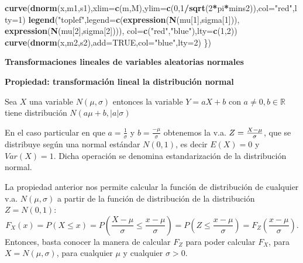 \documentclass[]{book}
\newenvironment{Shaded}{\begin{snugshade}}{\end{snugshade}}
\newcommand{\DataTypeTok}[1]{\textcolor[rgb]{0.13,0.29,0.53}{#1}}
\newcommand{\DecValTok}[1]{\textcolor[rgb]{0.00,0.00,0.81}{#1}}
\newcommand{\KeywordTok}[1]{\textcolor[rgb]{0.13,0.29,0.53}{\textbf{#1}}}
\newcommand{\NormalTok}[1]{#1}
\newcommand{\OperatorTok}[1]{\textcolor[rgb]{0.81,0.36,0.00}{\textbf{#1}}}
\newcommand{\OtherTok}[1]{\textcolor[rgb]{0.56,0.35,0.01}{#1}}
\newcommand{\StringTok}[1]{\textcolor[rgb]{0.31,0.60,0.02}{#1}}
\begin{document}
\begin{Shaded}
\begin{Highlighting}[]
\KeywordTok{curve}\NormalTok{(}\KeywordTok{dnorm}\NormalTok{(x,m1,s1),}\DataTypeTok{xlim=}\KeywordTok{c}\NormalTok{(m,M),}\DataTypeTok{ylim=}\KeywordTok{c}\NormalTok{(}\DecValTok{0}\NormalTok{,}\DecValTok{1}\OperatorTok{/}\KeywordTok{sqrt}\NormalTok{(}\DecValTok{2}\OperatorTok{*}\NormalTok{pi}\OperatorTok{*}\NormalTok{mins2)),}\DataTypeTok{col=}\StringTok{"red"}\NormalTok{,}\DataTypeTok{lty=}\DecValTok{1}\NormalTok{)}
\KeywordTok{legend}\NormalTok{(}\StringTok{"toplef"}\NormalTok{,}\DataTypeTok{legend=}\KeywordTok{c}\NormalTok{(}\KeywordTok{expression}\NormalTok{(}\KeywordTok{N}\NormalTok{(mu[}\DecValTok{1}\NormalTok{],sigma[}\DecValTok{1}\NormalTok{])),}
                         \KeywordTok{expression}\NormalTok{(}\KeywordTok{N}\NormalTok{(mu[}\DecValTok{2}\NormalTok{],sigma[}\DecValTok{2}\NormalTok{]))),}
       \DataTypeTok{col=}\KeywordTok{c}\NormalTok{(}\StringTok{"red"}\NormalTok{,}\StringTok{"blue"}\NormalTok{),}\DataTypeTok{lty=}\KeywordTok{c}\NormalTok{(}\DecValTok{1}\NormalTok{,}\DecValTok{2}\NormalTok{))}
\KeywordTok{curve}\NormalTok{(}\KeywordTok{dnorm}\NormalTok{(x,m2,s2),}\DataTypeTok{add=}\OtherTok{TRUE}\NormalTok{,}\DataTypeTok{col=}\StringTok{"blue"}\NormalTok{,}\DataTypeTok{lty=}\DecValTok{2}\NormalTok{)}
\NormalTok{\})}
\end{Highlighting}
\end{Shaded}

\textbf{Transformaciones lineales de variables aleatorias normales}

\textbf{Propiedad: transformación lineal la distribución normal}

Sea \(X\) una variable \(N(\mu,\sigma)\) entonces la variable \(Y=a X+b\) con
\(a\not=0,b\in\mathbb{R}\) tiene distribución \(N(a\mu+b, |a| \sigma)\)

En el caso particular en que \(a=\frac1{\sigma}\) y \(b= \frac{-\mu}{\sigma}\) obtenemos la v.a. \(Z={{X-\mu}\over {\sigma}}\), que
se distribuye según una normal estándar \(N(0,1)\), es decir \(E(X)=0\) y \(Var(X)=1\). Dicha operación se denomina estandarización de la
distribución normal.

La propiedad anterior nos permite calcular la función de distribución de cualquier v.a. \(N(\mu,\sigma)\) a partir de la función de distribución de la distribución \(Z=N(0,1)\):
\[
F_X(x)=P(X\leq x)=P\left(\frac{X-\mu}{\sigma}\leq \frac{x-\mu}{\sigma}\right)=P\left(Z\leq \frac{x-\mu}{\sigma}\right)=F_Z \left(\frac{x-\mu}{\sigma}\right).
\]
Entonces, basta conocer la manera de calcular \(F_Z\) para poder calcular \(F_X\), para \(X=N(\mu,\sigma)\), para cualquier \(\mu\) y cualquier \(\sigma>0\).
\end{document}
